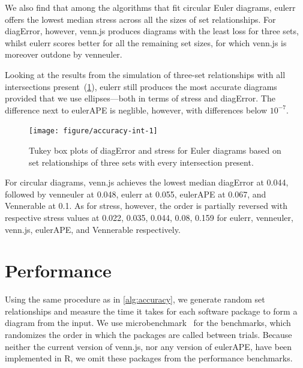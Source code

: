 \documentclass[
  oneside,
  openany,
  numbers=noendperiod,
  parskip=half,
  bibliography=totoc
]{scrbook}\usepackage[]{graphicx}\usepackage{xcolor}
\newenvironment{knitrout}{}{} %
\newcommand{\pkg}[1]{{\fontseries{b}\selectfont #1}}
\begin{document}
We also find that among the algorithms that fit circular Euler diagrams,
\pkg{eulerr} offers the lowest median stress across all the sizes of set
relationships. For diagError, however, \pkg{venn.js} produces diagrams with the
least loss for three sets, whilst \pkg{eulerr} scores better for all the remaining set sizes,
for which \pkg{venn.js} is moreover outdone by \pkg{venneuler}.



Looking at the results from the simulation of three-set relationships with
all intersections present~(\cref{fig:accuracy-int}), \pkg{eulerr} still
produces the most accurate diagrams provided that we use ellipses---both in
terms of stress and diagError. The
difference next to \pkg{eulerAPE} is neglible, however, with differences
below $10^{-7}$.

\begin{figure}[hbtp]
\caption{Tukey box plots of diagError and stress for Euler diagrams
based on set relationships of three sets with every
intersection present.\label{fig:accuracy-int}}
\begin{knitrout}\small
{}\color{fgcolor}

{\centering \texttt{[image: figure/accuracy-int-1]} 

}



\end{knitrout}
\end{figure}

For circular diagrams, \pkg{venn.js} achieves the lowest median diagError at
0.044, followed by \pkg{venneuler} at 0.048,
\pkg{eulerr} at 0.055, \pkg{eulerAPE} at 0.067,
and \pkg{Vennerable} at 0.1. As for stress, however, the order is
partially reversed with respective stress values at
0.022, 0.035, 0.044, 0.08,
0.159 for
\pkg{eulerr}, \pkg{venneuler}, \pkg{venn.js}, \pkg{eulerAPE}, and \pkg{Vennerable}
respectively.

\section{Performance}
\label{sec:performance}

Using the same procedure as in \cref{alg:accuracy}, we generate random set
relationships and measure the time it takes for each software package to form a
diagram from the input. We use \pkg{microbenchmark}~\citep{Ooms_2017} for the benchmarks,
which randomizes the order in which the packages are called between trials.
Because neither the current version of \pkg{venn.js}, nor any version of \pkg{eulerAPE},
have been implemented in R, we omit these packages from the
performance benchmarks.
\end{document}
